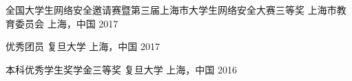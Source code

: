 


\vspace{-1.5mm}
\begin{cvhonors}

\cvhonor
{全国大学生网络安全邀请赛暨第三届上海市大学生网络安全大赛三等奖} %
{上海市教育委员会} %
{上海，中国} %
{2017} %




\cvhonor
{优秀团员} %
{复旦大学} %
{上海，中国} %
{2017} %




\cvhonor
{本科优秀学生奖学金三等奖} %
{复旦大学} %
{上海，中国} %
{2016} %





\end{cvhonors}
